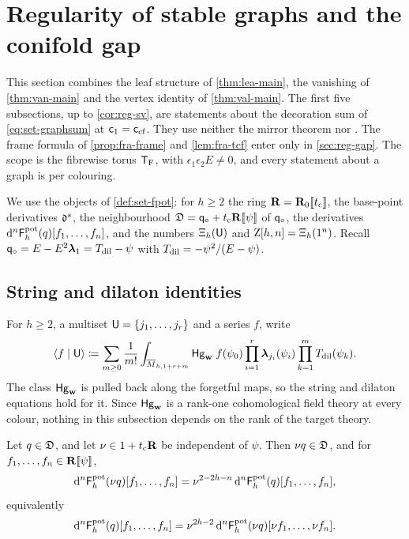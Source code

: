 \section{Regularity of stable graphs and the conifold gap}
\label{sec:reg}

This section combines the leaf structure of \cref{thm:lea-main}, the vanishing of \cref{thm:van-main} and the vertex identity of \cref{thm:val-main}. The first five subsections, up to \cref{cor:reg-sv}, are statements about the decoration sum of \cref{eq:set-graphsum} at $\mathsf{c}_{1}=\mathsf{c}_{\mathrm{cf}}$. They use neither the mirror theorem nor \cite[Theorem~(2)]{Tel12}. The frame formula of \cref{prop:fra-frame} and \cref{lem:fra-tcf} enter only in \cref{sec:reg-gap}. The scope is the fibrewise torus $\mathsf{T}_{\mathrm{F}}$, with $\epsilon_1\epsilon_2 E\neq 0$, and every statement about a graph is per colouring.

We use the objects of \cref{def:set-fpot}: for $h\geq 2$ the ring $\mathbf{R}=\mathbf{R}_0[\![ t_{\mathrm{c}} ]\!]$, the base-point derivatives $\mathfrak{d}^s$, the neighbourhood $\mathfrak{D}=\mathsf{q}_{\circ}+t_{\mathrm{c}}\mathbf{R}[\![ \psi ]\!]$ of $\mathsf{q}_{\circ}$, the derivatives $\mathrm{d}^n\mathsf{F}^{\mathrm{pot}}_h(q)[f_1,\dots,f_n]$, and the numbers $\Xi_h(\mathsf{U})$ and $\mathrm{Z}[h,n]=\Xi_h(1^n)$. Recall $\mathsf{q}_{\circ}=E-E^2\boldsymbol{\lambda}_1=T_{\mathrm{dil}}-\psi$ with $T_{\mathrm{dil}}=-\psi^2/(E-\psi)$.

\subsection{String and dilaton identities}

For $h\geq 2$, a multiset $\mathsf{U}=\{j_1,\dots,j_r\}$ and a series $f$, write
\[
\langle f\mid\mathsf{U}\rangle \coloneqq \sum_{m\geq 0}\frac{1}{m!}\int_{\overline{M}_{h,1+r+m}}\mathsf{Hg}_{\mathbf{w}}\; f(\psi_0)\prod_{i=1}^{r}\boldsymbol{\lambda}_{j_i}(\psi_i)\prod_{k=1}^{m}T_{\mathrm{dil}}(\psi_k).
\]
The class $\mathsf{Hg}_{\mathbf{w}}$ is pulled back along the forgetful maps, so the string and dilaton equations hold for it. Since $\mathsf{Hg}_{\mathbf{w}}$ is a rank-one cohomological field theory at every colour, nothing in this subsection depends on the rank of the target theory.

\begin{lem}
\label{lem:reg-H0}
Let $q\in\mathfrak{D}$, and let $\nu\in 1+t_{\mathrm{c}}\mathbf{R}$ be independent of $\psi$. Then $\nu q\in\mathfrak{D}$, and for $f_1,\dots,f_n\in\mathbf{R}[\![ \psi ]\!]$,
\[
\mathrm{d}^n\mathsf{F}^{\mathrm{pot}}_h(\nu q)[f_1,\dots,f_n]=\nu^{2-2h-n}\,\mathrm{d}^n\mathsf{F}^{\mathrm{pot}}_h(q)[f_1,\dots,f_n],
\]
equivalently
\begin{equation}
\label{eq:reg-H0}
\mathrm{d}^n\mathsf{F}^{\mathrm{pot}}_h(q)[f_1,\dots,f_n]=\nu^{2h-2}\,\mathrm{d}^n\mathsf{F}^{\mathrm{pot}}_h(\nu q)[\nu f_1,\dots,\nu f_n].
\end{equation}
\end{lem}

